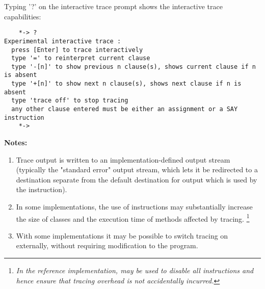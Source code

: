 Typing '?' on the interactive trace prompt shows the interactive trace capabilities:
\begin{lstlisting}
    *-> ?
Experimental interactive trace :
  press [Enter] to trace interactively
  type '=' to reinterpret current clause
  type '-[n]' to show previous n clause(s), shows current clause if n is absent
  type '+[n]' to show next n clause(s), shows next clause if n is absent
  type 'trace off' to stop tracing
  any other clause entered must be either an assignment or a SAY instruction
    *-> 
\end{lstlisting}
 \textbf{Notes:}
\begin{enumerate}
\item 
Trace output is written to an implementation-defined output stream
(typically the "standard error" output stream, which lets it be
redirected to a destination separate from the default destination for
output which is used by the  instruction).
\item In some implementations, the use of  instructions
may substantially increase the size of classes and the execution time of
methods affected by tracing.
\footnote{
\emph{In the reference implementation,  may be
used to disable all  instructions and hence ensure that
tracing overhead is not accidentally incurred.}
}
\item With some implementations it may be possible to switch tracing on
externally, without requiring modification to the program.
\end{enumerate}

